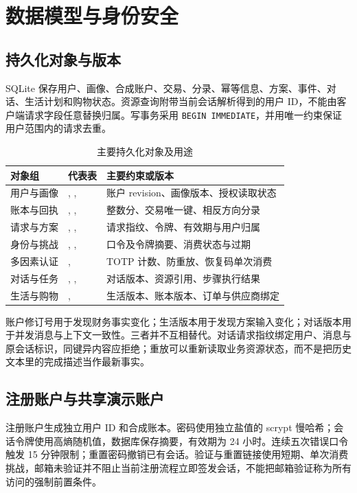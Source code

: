 \sectionstart
\section{数据模型与身份安全}
\subsection{持久化对象与版本}
SQLite 保存用户、画像、合成账户、交易、分录、幂等信息、方案、事件、对话、生活计划和购物状态。资源查询附带当前会话解析得到的用户 ID，不能由客户端请求字段任意替换归属。写事务采用 \texttt{BEGIN IMMEDIATE}，并用唯一约束保证用户范围内的请求去重。

\begin{table}[htbp]\centering\small
\caption{主要持久化对象及用途}
\begin{tabularx}{\textwidth}{@{}L{2.2cm}L{4.25cm}Y@{}}\toprule
对象组 & 代表表 & 主要约束或版本 \\\midrule
用户与画像 & , ,  & 账户 revision、画像版本、授权读取状态 \\
账本与回执 & , ,  & 整数分、交易唯一键、相反方向分录 \\
请求与方案 & , ,  & 请求指纹、令牌、有效期与用户归属 \\
身份与挑战 & , ,  & 口令及令牌摘要、消费状态与过期 \\
多因素认证 & ,  & TOTP 计数、防重放、恢复码单次消费 \\
对话与任务 & , ,  & 对话版本、资源引用、步骤执行结果 \\
生活与购物 & ,  & 生活版本、账本版本、订单与供应商绑定 \\\bottomrule
\end{tabularx}
\end{table}

账户修订号用于发现财务事实变化；生活版本用于发现方案输入变化；对话版本用于并发消息与上下文一致性。三者并不互相替代。对话请求指纹绑定用户、消息与原会话标识，同键异内容应拒绝；重放可以重新读取业务资源状态，而不是把历史文本里的完成描述当作最新事实。

\subsection{注册账户与共享演示账户}
注册账户生成独立用户 ID 和合成账本。密码使用独立盐值的 scrypt 慢哈希；会话令牌使用高熵随机值，数据库保存摘要，有效期为 24 小时。连续五次错误口令触发 15 分钟限制；重置密码撤销已有会话。验证与重置链接使用短期、单次消费挑战，邮箱未验证并不阻止当前注册流程立即签发会话，不能把邮箱验证称为所有访问的强制前置条件。

